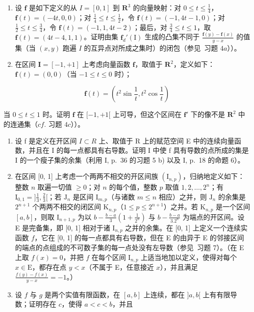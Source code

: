 \begin{enumerate}
\def\labelenumi{\arabic{enumi})}
\setcounter{enumi}{4}
\item
  设 \(\mathbf{f}\) 是如下定义的从 \(I = [0, 1]\) 到 \(\mathbf{R}^3\) 的向量映射：对 \(0 \leqslant t \leqslant \frac{1}{4}\)，\(\mathbf{f}(t) = (-4t, 0, 0)\)；对 \(\frac{1}{4} \leqslant t \leqslant \frac{1}{2}\)，令 \(\mathbf{f}(t) = (-1, 4t - 1, 0)\)；对 \(\frac{1}{2} \leqslant t \leqslant \frac{3}{4}\)，令 \(\mathbf{f}(t) = (-1, 1, 4t - 2)\)；最后，对 \(\frac{3}{4} \leqslant t \leqslant 1\)，取 \(\mathbf{f}(t) = (4t - 4, 1, 1)\)。证明由集 \(\mathbf{f}_d'(\mathrm{I})\) 生成的凸集不同于 \(\frac{\mathbf{f}(y) - \mathbf{f}(x)}{y - x}\) 的值集（当 \((x, y)\) 跑遍 \(I\) 的互异点对所成之集时）的闭包（参见~习题 \(4a\)））。
\item
  在区间 \(\mathbf{I} = [-1, + 1]\) 上考虑向量函数 \(\mathbf{f}\)，取值于 \(\mathbf{R}^2\)，定义如下：\(\mathbf{f}(t) = (0,0)\)（当 \(-1\leqslant t\leqslant 0\) 时）；
\end{enumerate}

\[
\mathbf {f} (t) = \left(t ^ {2} \sin \frac {1}{t}, t ^ {2} \cos \frac {1}{t}\right)
\]

当 \(0 \leqslant t \leqslant 1\) 时。证明 \(\mathbf{f}\) 在 \([-1, +1[\) 上可导，但这个区间在 \(\mathbf{f}'\) 下的像不是 \(\mathbf{R}^2\) 中的连通集（\(cf.\) 习题 \(4c\)））。

\begin{enumerate}
\def\labelenumi{\arabic{enumi})}
\setcounter{enumi}{6}
\item
  设 f 是定义在开区间 \(I \subset R\) 上、取值于 R 上的赋范空间 E 中的连续向量函数，并且在 I 的每一点都具有右导数。证明 I 中使 f 具有导数的点所成的集是 I 的一个瘦子集的余集（利用 I, p.~36 的习题 5 b) 以及 I, p.~18 的命题 6）。
\item
  在区间 {[}0, 1{]} 上考虑一个两两不相交的开区间族 \((\mathrm{I}_{n,p})\)，归纳地定义如下：整数 \(n\) 取遍一切值 \(\geqslant 0\)；对 \(n\) 的每个值，整数 \(p\) 取值 \(1,2,\ldots ,2^n\)；有 \(\mathrm{I}_{0,1} = ]\frac{1}{3},\frac{2}{3}[\)；若 \(\mathrm{J}_n\) 是区间 \(\mathrm{I}_{m,p}\)（与诸数 \(m\leqslant n\) 相应）之并，则 \(\mathrm{J}_n\) 的余集是 \(2^{n + 1}\) 个两两不相交的闭区间 \(\mathrm{K}_{n,p}\)（\(1\leqslant p\leqslant 2^{n + 1}\)）之并。若 \(\mathrm{K}_{n,p}\) 是一个区间 \([a,b]\)，则取 \(\mathrm{I}_{n + 1,p}\) 为以 \(b - \frac{b - a}{3}\left(1 + \frac{1}{2^n}\right)\) 与 \(b - \frac{b - a}{3.2^n}\) 为端点的开区间。设 E 是完备集，即 {[}0, 1{]} 相对于诸 \(\mathrm{I}_{n,p}\) 之并的余集。在 {[}0, 1{]} 上定义一个连续实函数 \(f\)，它在 {[}0, 1{]} 的每一点都具有右导数，但在 E 的由异于 E 的邻接区间的端点的点组成的不可数子集的每一点处没有左导数（参见~习题 7）。（在 E 上取 \(f(x) = 0\)，并把 \(f\) 在每个区间 \(\mathrm{I}_{n,p}\) 上适当地加以定义，使得对每个 \(x\in \mathrm{E}\)，都存在点 \(y < x\)（不属于 E，任意接近 \(x\)），并且满足 \(\frac{f(y) - f(x)}{y - x} = -1\)。）
\item
  设 \(f\) 与 \(g\) 是两个实值有限函数，在 \([a, b]\) 上连续，都在 \(]a, b[\) 上有有限导数；证明存在 \(c\)，使得 \(a < c < b\)，并且
\end{enumerate}

